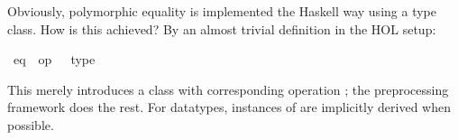 \begin{isabellebody}
\begin{isamarkuptext}%
Obviously, polymorphic equality is implemented the Haskell
  way using a type class.  How is this achieved?  By an
  almost trivial definition in the HOL setup:%
\end{isamarkuptext}%
\isamarkuptrue%
%
\isadelimML
%
\endisadelimML
%
\isatagML
%
\endisatagML
{\isafoldML}%
%
\isadelimML
%
\endisadelimML
{}\isamarkupfalse%
\ eq\ {\isacharparenleft}\ {\isachardoublequoteopen}op\ {\isacharequal}{\isachardoublequoteclose}{\isacharparenright}\ {\isacharequal}\ type%
\begin{isamarkuptext}%
This merely introduces a class  with corresponding
  operation ;
  the preprocessing framework does the rest.
  For datatypes, instances of  are implicitly derived
  when possible.


\end{isamarkuptext}
\end{isabellebody}
